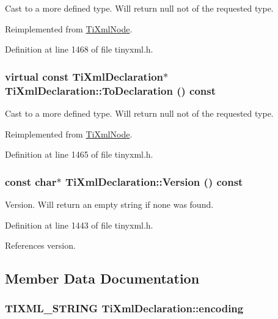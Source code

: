 Cast to a more defined type. Will return null not of the requested type. 

Reimplemented from \hyperlink{class_ti_xml_node_a4027136ca820ff4a636b607231b6a6df}{TiXmlNode}.

Definition at line 1468 of file tinyxml.h.\hypertarget{class_ti_xml_declaration_a1e085d3fefd1dbf5ccdbff729931a967}{
\subsubsection[{ToDeclaration}]{\setlength{\rightskip}{0pt plus 5cm}virtual const {\bf TiXmlDeclaration}$\ast$ TiXmlDeclaration::ToDeclaration () const}}
\label{class_ti_xml_declaration_a1e085d3fefd1dbf5ccdbff729931a967}


Cast to a more defined type. Will return null not of the requested type. 

Reimplemented from \hyperlink{class_ti_xml_node_a9f43e6984fc7d4afd6eb32714c6b7b72}{TiXmlNode}.

Definition at line 1465 of file tinyxml.h.\hypertarget{class_ti_xml_declaration_a02ee557b1a4545c3219ed377c103ec76}{
\subsubsection[{Version}]{\setlength{\rightskip}{0pt plus 5cm}const char$\ast$ TiXmlDeclaration::Version () const}}
\label{class_ti_xml_declaration_a02ee557b1a4545c3219ed377c103ec76}


Version. Will return an empty string if none was found. 

Definition at line 1443 of file tinyxml.h.

References version.

\subsection{Member Data Documentation}
\hypertarget{class_ti_xml_declaration_a24b8645d7696ec169bbb3fb7d30860cf}{
\subsubsection[{encoding}]{\setlength{\rightskip}{0pt plus 5cm}TIXML\_\-STRING {\bf TiXmlDeclaration::encoding}}}
\label{class_ti_xml_declaration_a24b8645d7696ec169bbb3fb7d30860cf}


